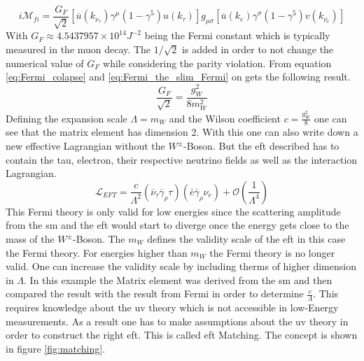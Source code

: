 \documentclass[../Bachelorarbeit.tex]{subfiles}
\begin{document}
\begin{equation}
    i\mathcal{M}_{fi} = \frac{G_{F}}{\sqrt{2}} \left[ \overline{u}(k_{\nu_{\tau}})\gamma^{\mu}(1-\gamma^{5})u(k_{\tau}) \right] g_{\mu\sigma} \left[ \overline{u}(k_{e})\gamma^{\sigma}(1-\gamma^{5})v(k_{\overline{\nu_{e}}}) \right]
    \label{eq:Fermi_the_slim_Fermi}
\end{equation}
With $G_{F} \approx 4.5437957\times 10^{14} J^{-2}$ being the Fermi constant which is typically measured in the muon decay. The $1/\sqrt{2}$ is added in order to not change the numerical value of $G_{F}$ while considering the parity violation.
From equation \ref{eq:Fermi_colapse} and \ref{eq:Fermi_the_slim_Fermi} on gets the following result.
\begin{equation}
    \frac{G_{F}}{\sqrt{2}} = \frac{g_{W}^{2}}{8 m_{W}^{2}}
\end{equation}
Defining the expansion scale $\Lambda=m_{W}$ and the Wilson coefficient $c= \frac{g_{W}^{2}}{8}$ one can see that the matrix element has dimension 2.
With this one can also write down a new effective Lagrangian without the $W^{\pm }$-Boson. But the \acrshort{eft} described has to contain the tau, electron, their respective neutrino fields
as well as the interaction Lagrangian.
\begin{equation}
    \mathcal{L}_{EFT} = \frac{c}{\Lambda^{2}} \left( \overline{\nu}_{\tau} \overline{\gamma}_{\rho} \tau \right) \left(\bar{e} \overline{\gamma}_{\rho} \nu_{e} \right) + \mathcal{O}(\frac{1}{\Lambda^{4}})
\end{equation}
This Fermi theory is only valid for low energies since the scattering amplitude from the \acrshort{sm} and the \acrshort{eft} would
start to diverge once the energy gets close to the mass of the $W^{\pm}$-Boson.
The $m_{W}$ defines the validity scale of the \acrshort{eft} in this case the Fermi theory. For energies higher than $m_{W}$ the
Fermi theory is no longer valid. One can increase the validity scale by including therms of higher dimension in $\Lambda$.
In this example the Matrix element was derived from the \acrshort{sm} and then compared the result with the result from Fermi in
order to determine $\frac{c}{\Lambda}$. This requires knowledge about the \acrshort{uv} theory which is not accessible in low-Energy
measurements. As a result one has to make assumptions about the \acrshort{uv} theory in order to construct the right \acrshort{eft}. This is called \acrshort{eft} Matching. The concept is shown in figure \ref{fig:matching}.
\end{document}
